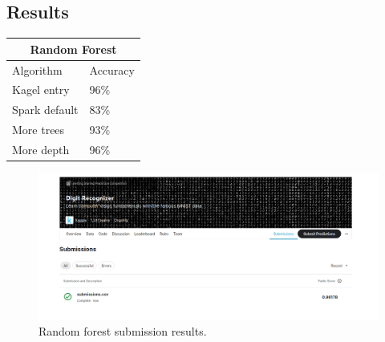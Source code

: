 \documentclass{article}
\begin{document}
	\subsection{Results}
		\begin{tabular}{ |p{3cm}||p{3cm}| }
			\hline
			\multicolumn{2}{|c|}{Random Forest} \\
			\hline
			Algorithm& Accuracy\\
			\hline
			Kagel entry	& 	96\%\\
			Spark default&   83\%\\
			More trees &	93\%\\
			More depth &	96\%\\
			\hline
		\end{tabular}
		\begin{figure}[h]
			\centering
			\includegraphics[scale=0.30]{submission_random_forest}
			\caption{Random forest submission results.}
		\end{figure}
\end{document}
